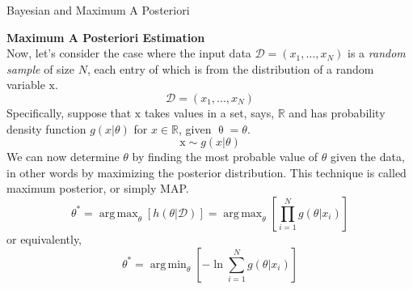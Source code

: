 \documentclass{bredelebeamer}
\DeclareMathOperator*{\argmax}{arg\,max}
\DeclareMathOperator*{\argmin}{arg\,min}
\begin{document}
\begin{frame}{Bayesian and Maximum A Posteriori}
  \begin{justify}
    \textbf{Maximum A Posteriori Estimation} \\
    Now, let's consider the case where the input data $\mathcal{D}=(\mathit{x}_1,\ldots,\mathit{x}_N)$
    is a \textit{random sample} of size $N$, each entry of which is from the
    distribution of a random variable $\mathrm{x}$.
    \begin{equation}
      \mathcal{D}=(\mathit{x}_1,\ldots,\mathit{x}_N)
    \end{equation}
    Specifically, suppose that $\mathrm{x}$ takes values in a set, says, $\mathbb{R}$
    and has probability density function $g(\mathit{x}|\theta)$ for $\mathit{x} \in \mathbb{R}$,
    given $\uptheta=\theta$.
    \begin{equation}
      \mathrm{x} \sim g(\mathit{x}|\theta)
    \end{equation}
    We can now determine $\theta$ by finding the most probable value of $\theta$
    given the data, in other words by maximizing the posterior distribution. This
    technique is called maximum posterior, or simply \textrm{MAP}.
    \begin{equation}
      \theta^{*} = \argmax_{\theta} [h(\theta|\mathcal{D})]
        = \argmax_{\theta} [\prod_{i=1}^{N} g(\theta|\mathit{x_i})]
    \end{equation}
    or equivalently,
    \begin{equation}
      \theta^{*} = \argmin_{\theta} [- \ln \sum_{i=1}^{N} g(\theta|\mathit{x_i})]
    \end{equation}
  \end{justify}
\end{frame}

\end{document}
